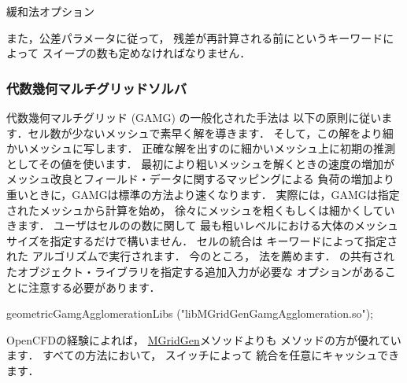 \begin{table}[ht]
 
 \caption{緩和法オプション}
 \label{tbl:4.14}
\end{table}


また，公差パラメータに従って，
残差が再計算される前にというキーワードによって
スイープの数も定めなければなりません．


\subsubsection{代数幾何マルチグリッドソルバ}
\label{sssec:4.5.1.4}
%
%
代数幾何マルチグリッド (GAMG) の一般化された手法は
以下の原則に従います．セル数が少ないメッシュで素早く解を導きます．
そして，この解をより細かいメッシュに写します．
正確な解を出すのに細かいメッシュ上に初期の推測としてその値を使います．
最初により粗いメッシュを解くときの速度の増加が
メッシュ改良とフィールド・データに関するマッピングによる
負荷の増加より重いときに，GAMGは標準の方法より速くなります．
実際には，GAMGは指定されたメッシュから計算を始め，
徐々にメッシュを粗くもしくは細かくしていきます．
ユーザはセルのの数に関して
最も粗いレベルにおける大体のメッシュサイズを指定するだけで構いません．
セルの統合は
%
%
キーワードによって指定された
アルゴリズムで実行されます．
今のところ，
%
%
法を薦めます．
の共有されたオブジェクト・ライブラリを指定する追加入力が必要な
%
%
オプションがあることに注意する必要があります．
\begin{OFverbatim}[file]
geometricGamgAgglomerationLibs ("libMGridGenGamgAgglomeration.so");
\end{OFverbatim}
OpenCFDの経験によれば，
\href{http://www-users.cs.umn.edu/~moulitsa/software.html}{MGridGen}メソッドよりも
メソッドの方が優れています．
すべての方法において，
%
%
スイッチによって
統合を任意にキャッシュできます．
